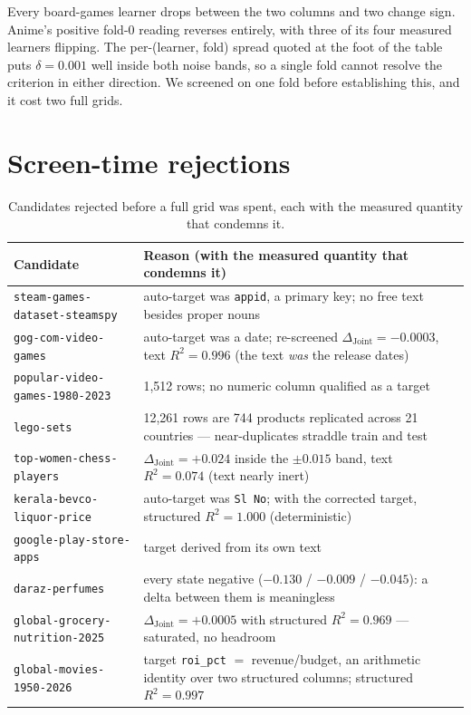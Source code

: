 \documentclass{article}
\newcommand{\djoint}{\Delta_{\text{Joint}}}
\begin{document}
\noindent Every board-games learner drops between the two columns and two change sign. Anime's positive
fold-0 reading reverses entirely, with three of its four measured learners flipping. The
per-(learner, fold) spread quoted at the foot of the table puts $\delta = 0.001$ well inside
both noise bands, so a single fold cannot resolve the criterion in either direction. We
screened on one fold before establishing this, and it cost two full grids.


\clearpage
\section{Screen-time rejections}
\label{app:screen}

\begin{table}[H]
\centering\small
\caption{Candidates rejected before a full grid was spent, each with the measured quantity
that condemns it.}
\begin{tabular}{p{}p{}}
\toprule
Candidate & Reason (with the measured quantity that condemns it) \\
\midrule
\texttt{steam-games-dataset-steamspy} & auto-target was \texttt{appid}, a primary key; no free text besides proper nouns \\
\texttt{gog-com-video-games} & auto-target was a date; re-screened $\djoint = -0.0003$, text $R^2 = 0.996$ (the text \emph{was} the release dates) \\
\texttt{popular-video-games-1980-2023} & 1{,}512 rows; no numeric column qualified as a target \\
\texttt{lego-sets} & 12{,}261 rows are 744 products replicated across 21 countries --- near-duplicates straddle train and test \\
\texttt{top-women-chess-players} & $\djoint = +0.024$ inside the $\pm 0.015$ band, text $R^2 = 0.074$ (text nearly inert) \\
\texttt{kerala-bevco-liquor-price} & auto-target was \texttt{Sl No}; with the corrected target, structured $R^2 = 1.000$ (deterministic) \\
\texttt{google-play-store-apps} & target derived from its own text \\
\texttt{daraz-perfumes} & every state negative ($-0.130$ / $-0.009$ / $-0.045$): a delta between them is meaningless \\
\texttt{global-grocery-nutrition-2025} & $\djoint = +0.0005$ with structured $R^2 = 0.969$ --- saturated, no headroom \\
\texttt{global-movies-1950-2026} & target \texttt{roi\_pct} $=$ revenue/budget, an arithmetic identity over two structured columns; structured $R^2 = 0.997$ \\

\end{tabular}
\end{table}
\end{document}
